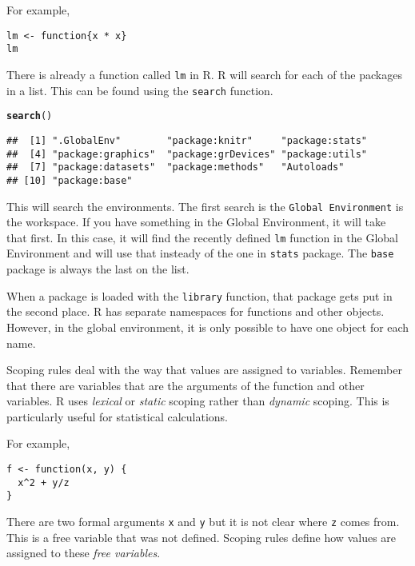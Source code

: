 \documentclass[12pt, a4paper, oneside]{article}\usepackage[]{graphicx}\usepackage[]{color}
\makeatletter
\newcommand{\hlstd}[1]{\textcolor[rgb]{0.345,0.345,0.345}{#1}}%
\newcommand{\hlkwd}[1]{\textcolor[rgb]{0.737,0.353,0.396}{\textbf{#1}}}%
\newenvironment{kframe}{%
 \def\at@end@of@kframe{}%
 \ifinner\ifhmode%
  \def\at@end@of@kframe{\end{minipage}}%
  \begin{minipage}{\columnwidth}%
 \fi\fi%
 \def\FrameCommand##1{\hskip\@totalleftmargin \hskip-\fboxsep
 \colorbox{shadecolor}{##1}\hskip-\fboxsep
     \hskip-\linewidth \hskip-\@totalleftmargin \hskip\columnwidth}%
 \MakeFramed {\advance\hsize-\width
   \@totalleftmargin\z@ \linewidth\hsize
   \@setminipage}}%
 {\par\unskip\endMakeFramed%
 \at@end@of@kframe}
\newenvironment{knitrout}{}{} %
\makeatother
\begin{document}
For example, 

\begin{lstlisting}
lm <- function{x * x}
lm
\end{lstlisting}

There is already a function called \lstinline{lm} in R. R will search for each of the packages in a list.  This can be found using the \lstinline{search} function. 

\begin{knitrout}
\color{fgcolor}\begin{kframe}
\begin{alltt}
\hlkwd{search}\hlstd{()}
\end{alltt}
\begin{verbatim}
##  [1] ".GlobalEnv"        "package:knitr"     "package:stats"    
##  [4] "package:graphics"  "package:grDevices" "package:utils"    
##  [7] "package:datasets"  "package:methods"   "Autoloads"        
## [10] "package:base"
\end{verbatim}
\end{kframe}
\end{knitrout}

This will search the environments.  The first search is the \lstinline{Global Environment} is the workspace.  If you have something in the Global Environment, it will take that first. In this case, it will find the recently defined \lstinline{lm} function in the Global Environment and will use that insteady of the one in \lstinline{stats} package. The \lstinline{base} package is always the last on the list. 

When a package is loaded with the \lstinline{library} function, that package gets put in the second place. R has separate namespaces for functions and other objects. However, in the global environment, it is only possible to have one object for each name. 

Scoping rules deal with the way that values are assigned to variables.  Remember that there are variables that are the arguments of the function and other variables.  R uses \emph{lexical} or \emph{static} scoping rather than \emph{dynamic} scoping. This is particularly useful for statistical calculations. 

For example, 

\begin{lstlisting}
f <- function(x, y) {
  x^2 + y/z
}
\end{lstlisting}

There are two formal arguments \lstinline{x} and \lstinline{y} but it is not clear where \lstinline{z} comes from. This is a free variable that was not defined. Scoping rules define how values are assigned to these \emph{free variables}. 
\end{document}
